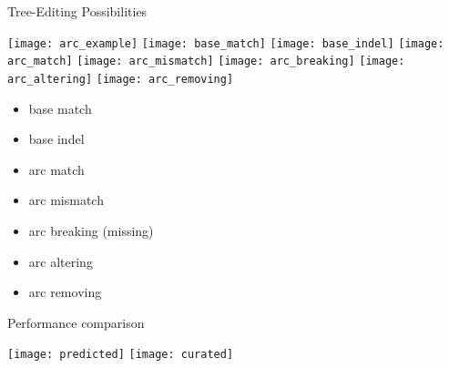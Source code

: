 \begin{frame}[c]{Tree-Editing Possibilities}
    \hspace{0mm}
    \begin{overprint}
    \centering\texttt{[image: arc\_example]}
    \centering\texttt{[image: base\_match]}
    \centering\texttt{[image: base\_indel]}
    \centering\texttt{[image: arc\_match]}
    \centering\texttt{[image: arc\_mismatch]}
    \centering\texttt{[image: arc\_breaking]}
    \centering\texttt{[image: arc\_altering]}
    \centering\texttt{[image: arc\_removing]}
    \end{overprint}

    \begin{multicols}{2}
    \begin{itemize}[<+(1)->]
        \item base match
        \item base indel
        \item arc match
        \item arc mismatch
        \item arc breaking (missing)
        \item arc altering
        \item arc removing
    \end{itemize}
    \end{multicols}
\end{frame}

\begin{frame}[c]{Performance comparison}
    \hspace{0mm}
    \begin{overprint}
    \centering\texttt{[image: predicted]}
    \centering\texttt{[image: curated]}
    \end{overprint}
\end{frame}

